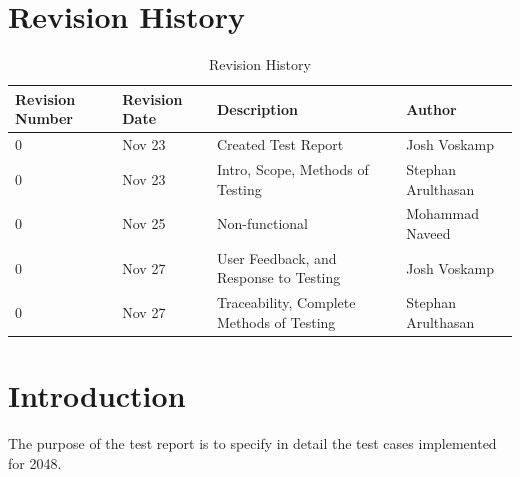 \documentclass[12pt]{article}
\begin{document}
\begin{titlepage}



\vfill %

\end{titlepage}

\newpage
\tableofcontents
\newpage
\listoftables
{}
\newpage
\listoffigures
{}
\newpage

\section*{Revision History}
\begin{table}[H]
	\centering
    \begin{tabular}{ | p{2cm} |  p{2cm} | p{5cm} | p{3.8cm} |}
    \hline
    Revision Number & Revision Date & Description & Author \\ \hline
    0 & Nov 23 & Created Test Report & Josh Voskamp \\ \hline
	0 & Nov 23 & Intro, Scope, Methods of Testing & Stephan Arulthasan\\ \hline
	0 & Nov 25 & Non-functional & Mohammad Naveed \\ \hline
	0 & Nov 27 & User Feedback, and Response to Testing & Josh Voskamp \\ \hline
	0 & Nov 27 & Traceability, Complete Methods of Testing & Stephan Arulthasan \\\hline
    \end{tabular}
    \caption{Revision History}
\end{table}

\newpage

\section{Introduction}
The purpose of the test report is to specify in detail the test cases implemented for 2048.
\end{document}

